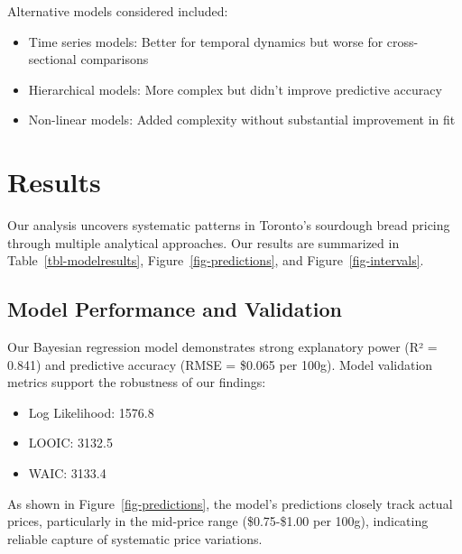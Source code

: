 \documentclass[
  letterpaper,
  DIV=11,
  numbers=noendperiod]{scrartcl}
\providecommand{\tightlist}{%
  \setlength{\itemsep}{0pt}\setlength{\parskip}{0pt}}\usepackage{longtable,booktabs,array}
\begin{document}
Alternative models considered included:

\begin{itemize}
\tightlist
\item
  Time series models: Better for temporal dynamics but worse for
  cross-sectional comparisons
\item
  Hierarchical models: More complex but didn't improve predictive
  accuracy
\item
  Non-linear models: Added complexity without substantial improvement in
  fit
\end{itemize}

\section{Results}\label{sec-results}

Our analysis uncovers systematic patterns in Toronto's sourdough bread
pricing through multiple analytical approaches. Our results are
summarized in Table~\ref{tbl-modelresults},
Figure~\ref{fig-predictions}, and Figure~\ref{fig-intervals}.

\subsection{Model Performance and
Validation}\label{model-performance-and-validation}

Our Bayesian regression model demonstrates strong explanatory power (R²
= 0.841) and predictive accuracy (RMSE = \$0.065 per 100g). Model
validation metrics support the robustness of our findings:

\begin{itemize}
\item
  Log Likelihood: 1576.8
\item
  LOOIC: 3132.5
\item
  WAIC: 3133.4
\end{itemize}

As shown in Figure~\ref{fig-predictions}, the model's predictions
closely track actual prices, particularly in the mid-price range
(\$0.75-\$1.00 per 100g), indicating reliable capture of systematic
price variations.
\end{document}
